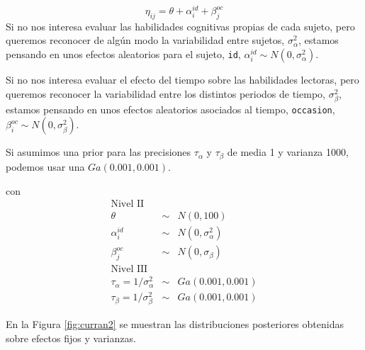 \documentclass[
]{book}
\begin{document}
\[\eta_{ij}=\theta + \alpha_i^{id} + \beta_j^{oc}\]
Si no nos interesa evaluar las habilidades cognitivas propias de cada sujeto, pero queremos reconocer de algún modo la variabilidad entre sujetos, \(\sigma_{\alpha}^2\), estamos pensando en unos efectos aleatorios para el sujeto, \texttt{id}, \(\alpha_i^{id} \sim N(0,\sigma_{\alpha}^2)\).

Si no nos interesa evaluar el efecto del tiempo sobre las habilidades lectoras, pero queremos reconocer la variabilidad entre los distintos periodos de tiempo, \(\sigma_{\beta}^2\), estamos pensando en unos efectos aleatorios asociados al tiempo, \texttt{occasion}, \(\beta_i^{oc} \sim N(0,\sigma_{\beta}^2)\).

Si asumimos una prior para las precisiones \(\tau_{\alpha}\) y \(\tau_{\beta}\) de media 1 y varianza 1000, podemos usar una \(Ga(0.001,0.001)\).

con
\begin{eqnarray*}
\text{Nivel II} && \\
\theta &\sim & N(0,100) \\
\alpha_i^{id} &\sim& N(0,\sigma_{\alpha}^2) \\
\beta_j^{oc} &\sim& N(0,\sigma_{\beta}) \\
\text{Nivel III} && \\
\tau_{\alpha}=1/\sigma_{\alpha}^2 &\sim& Ga(0.001,0.001) \\
\tau_{\beta}=1/\sigma_{\beta}^2 &\sim&Ga(0.001,0.001)
\end{eqnarray*}

En la Figura \ref{fig:curran2} se muestran las distribuciones posteriores obtenidas sobre efectos fijos y varianzas.
\end{document}
